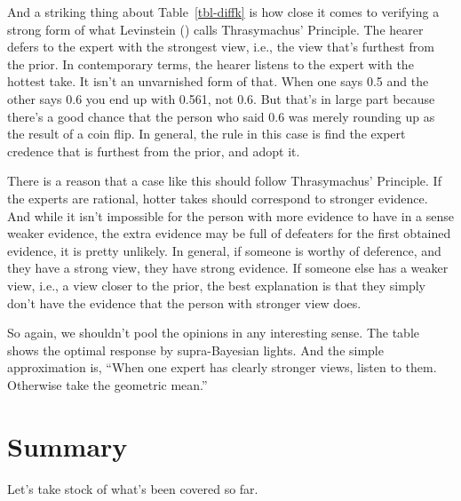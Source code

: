 \documentclass[
  11pt,
  letterpaper,
  DIV=11,
  numbers=noendperiod,
  twoside]{scrartcl}
\begin{document}
And a striking thing about Table~\ref{tbl-diffk} is how close it comes
to verifying a strong form of what Levinstein
() calls Thrasymachus' Principle. The
hearer defers to the expert with the strongest view, i.e., the view
that's furthest from the prior. In contemporary terms, the hearer
listens to the expert with the hottest take. It isn't an unvarnished
form of that. When one says 0.5 and the other says 0.6 you end up with
0.561, not 0.6. But that's in large part because there's a good chance
that the person who said 0.6 was merely rounding up as the result of a
coin flip. In general, the rule in this case is find the expert credence
that is furthest from the prior, and adopt it.

There is a reason that a case like this should follow Thrasymachus'
Principle. If the experts are rational, hotter takes should correspond
to stronger evidence. And while it isn't impossible for the person with
more evidence to have in a sense weaker evidence, the extra evidence may
be full of defeaters for the first obtained evidence, it is pretty
unlikely. In general, if someone is worthy of deference, and they have a
strong view, they have strong evidence. If someone else has a weaker
view, i.e., a view closer to the prior, the best explanation is that
they simply don't have the evidence that the person with stronger view
does.

So again, we shouldn't pool the opinions in any interesting sense. The
table shows the optimal response by supra-Bayesian lights. And the
simple approximation is, ``When one expert has clearly stronger views,
listen to them. Otherwise take the geometric mean.''

\section{Summary}\label{summary}

Let's take stock of what's been covered so far.
\end{document}
